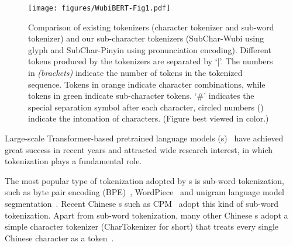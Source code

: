 \begin{figure*}[t]
\centering
\texttt{[image: figures/WubiBERT-Fig1.pdf]}
\caption{Comparison of existing tokenizers (character tokenizer and sub-word tokenizer) and our sub-character tokenizers (SubChar-Wubi using glyph and SubChar-Pinyin using pronunciation encoding).
Different tokens produced by the tokenizers are separated by `|'. The numbers in \textit{(brackets)} indicate the number of tokens in the tokenized sequence.
Tokens in \textcolor{BrickRed}{orange} indicate character combinations, while tokens in \textcolor{OliveGreen}{green} indicate sub-character tokens. `\#' indicates the special separation symbol after each character, circled numbers () indicate the intonation of characters.  (Figure best viewed in color.)}
\end{figure*}



Large-scale Transformer-based pretrained language models (\plm s)~\cite[][\textit{inter alia}]{BERT,RoBERTa,ALBERT,ELECTRA,DeBERTa} have achieved great success in recent years and attracted wide research interest, in which tokenization plays a fundamental role.

The most popular type of tokenization adopted by \plm{}s is sub-word tokenization, such as byte pair encoding (BPE)~\cite{BPE}, WordPiece~\cite{WordPiece} and unigram language model segmentation~\cite{Kudo2018}. 
Recent Chinese \plm{}s such as CPM~\cite{CPM,CPM2} adopt this kind of sub-word tokenization.
Apart from sub-word tokenization, many other Chinese \plm{}s adopt a simple character tokenizer (CharTokenizer for short) that treats every single Chinese character as a token~\cite[][\textit{inter alia}]{ERNIE,WWM,MacBERT}.

